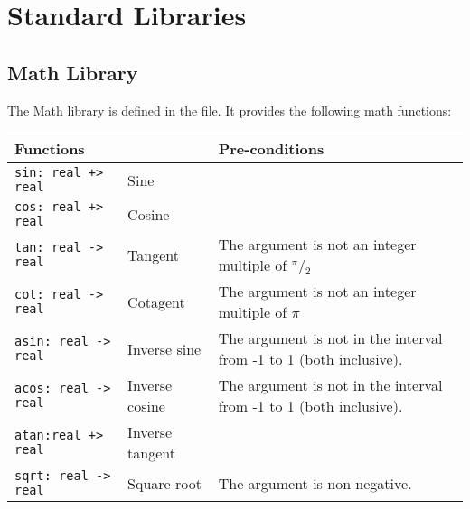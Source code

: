 \documentclass[\pformat,12pt]{article}
\begin{document}
\newpage

\section{Standard Libraries}\label{stdlib}

\subsection{Math Library}

The Math library is defined in the 
file.  It provides the following math functions:

\begin{center}
\begin{tabular}{|l|l|p{6cm}|}\hline
\multicolumn{2}{|l|}{\bf Functions} & \bf Pre-conditions\\ \hline
\verb/sin: real +> real/ & Sine &  \index{Sine} \\ \hline
\verb/cos: real +> real/ & Cosine &  \index{Cosine} \\ \hline
\verb/tan: real -> real/ & Tangent & The argument is not an integer multiple 
                                     of $^\pi\!/\!_2$ \index{Tangent} \\ \hline 
\verb/cot: real -> real/ & Cotagent & The argument is not an integer multiple 
                                      of $\pi$ \index{Cotangent} \\ \hline
\verb/asin: real -> real/ & Inverse sine & The argument is not in the interval
                                           from -1 to 1 (both inclusive). 
                                           \index{Inverse sine}\\ \hline
\verb/acos: real -> real/ & Inverse cosine & The argument is not in the 
                                      interval from -1 to 1 (both inclusive). 
                                      \index{Inverse cosine}\\ \hline
\verb/atan:real +> real/ & Inverse tangent & \index{Inverse tangent}\\ \hline
\verb/sqrt: real -> real/ & Square root & The argument is non-negative. 
                                          \index{Square root}\\ \hline
\end{tabular}
\end{center}
\end{document}
